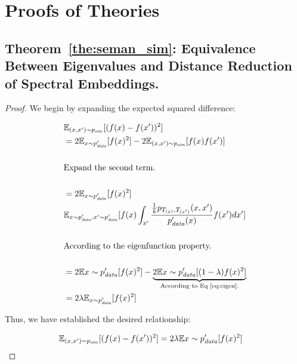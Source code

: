 \documentclass{article}
\begin{document}
\section{Proofs of Theories}

\subsection{\textbf{Theorem}~\ref{the:seman_sim}: Equivalence Between Eigenvalues and Distance Reduction of Spectral Embeddings.}\label{proof:eq}


\begin{proof}
    
We begin by expanding the expected squared difference:

\begin{equation}
\begin{aligned}
& \mathbb{E}_{(x, x^\prime)\sim p_{\text{\textit{sim}}}} [(f(x) - f(x^\prime))^2] \\
& = 2\mathbb{E}_{x \sim p_{\text{\textit{data}}}^\prime}[f(x)^2] - 2\mathbb{E}_{(x, x^\prime)\sim p_{\text{\textit{sim}}}}[f(x)f(x^\prime)] \\
&  \\ & \text{Expand the second term.} \\ \\
& =  2\mathbb{E}_{x \sim p_{\text{\textit{data}}}^\prime}[f(x)^2] \\ 
& \mathbb{E}_{x \sim p^\prime_{\text{\textit{data}}}, x^\prime \sim p_{\text{\textit{data}}}^\prime}[f(x) \int_{x^\prime} \frac { \frac 1 k p_{T_{(x)}, T_{(x^\prime)}}(x, x^\prime)} {p_{\text{\textit{data}}}^\prime(x)} f(x^\prime) dx^\prime] \\
&  \\ & \text{According to the eigenfunction property.} \\ \\
& = 2\mathbb{E}{x \sim p_{\text{\textit{data}}}^\prime}[f(x)^2] - \underbrace{2\mathbb{E}{x \sim p_{\text{\textit{data}}}^\prime}[(1-\lambda) f(x)^2]}_{\text{According to Eq~\ref{eq:eigen}.}} \\
& = 2\lambda\mathbb{E}_{x \sim p_{\text{\textit{data}}}^\prime}[f(x)^2]
\end{aligned}
\end{equation}

Thus, we have established the desired relationship:

\begin{equation}
\begin{aligned}
\mathbb{E}_{(x, x^\prime)\sim p_{\text{\textit{sim}}}} [(f(x) - f(x^\prime))^2]
& = 2\lambda\mathbb{E}{x \sim p_{\text{\textit{data}}}^\prime}[f(x)^2]
\end{aligned}
\end{equation}


\end{proof}
\end{document}
